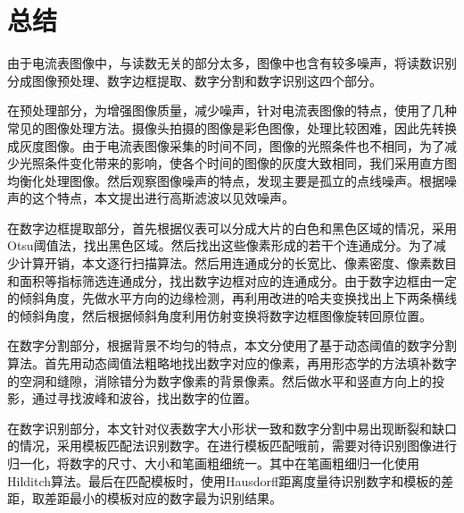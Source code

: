 
\chapter{总结}

由于电流表图像中，与读数无关的部分太多，图像中也含有较多噪声，将读数识别分成图像预处理、数字边框提取、数字分割和数字识别这四个部分。

在预处理部分，为增强图像质量，减少噪声，针对电流表图像的特点，使用了几种常见的图像处理方法。摄像头拍摄的图像是彩色图像，处理比较困难，因此先转换成灰度图像。由于电流表图像采集的时间不同，图像的光照条件也不相同，为了减少光照条件变化带来的影响，使各个时间的图像的灰度大致相同，我们采用直方图均衡化处理图像。然后观察图像噪声的特点，发现主要是孤立的点线噪声。根据噪声的这个特点，本文提出进行高斯滤波以见效噪声。

在数字边框提取部分，首先根据仪表可以分成大片的白色和黑色区域的情况，采用Otsu阈值法，找出黑色区域。然后找出这些像素形成的若干个连通成分。为了减少计算开销，本文逐行扫描算法。然后用连通成分的长宽比、像素密度、像素数目和面积等指标筛选连通成分，找出数字边框对应的连通成分。由于数字边框由一定的倾斜角度，先做水平方向的边缘检测，再利用改进的哈夫变换找出上下两条横线的倾斜角度，然后根据倾斜角度利用仿射变换将数字边框图像旋转回原位置。

在数字分割部分，根据背景不均匀的特点，本文分使用了基于动态阈值的数字分割算法。首先用动态阈值法粗略地找出数字对应的像素，再用形态学的方法填补数字的空洞和缝隙，消除错分为数字像素的背景像素。然后做水平和竖直方向上的投影，通过寻找波峰和波谷，找出数字的位置。

在数字识别部分，本文针对仪表数字大小形状一致和数字分割中易出现断裂和缺口的情况，采用模板匹配法识别数字。在进行模板匹配哦前，需要对待识别图像进行归一化，将数字的尺寸、大小和笔画粗细统一。其中在笔画粗细归一化使用Hilditch算法。最后在匹配模板时，使用Hausdorff距离度量待识别数字和模板的差距，取差距最小的模板对应的数字最为识别结果。

